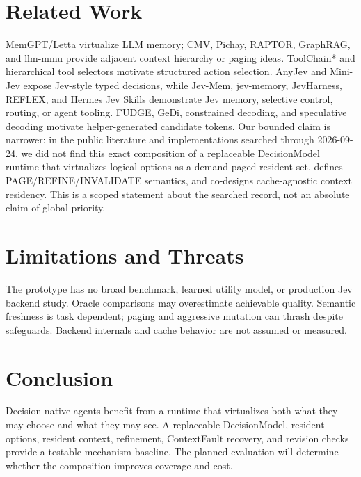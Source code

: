 \documentclass[11pt]{article}
\begin{document}
\section{Related Work}MemGPT/Letta virtualize LLM memory; CMV, Pichay, RAPTOR, GraphRAG, and llm-mmu provide adjacent context hierarchy or paging ideas. ToolChain* and hierarchical tool selectors motivate structured action selection. AnyJev and Mini-Jev expose Jev-style typed decisions, while Jev-Mem, jev-memory, JevHarness, REFLEX, and Hermes Jev Skills demonstrate Jev memory, selective control, routing, or agent tooling. FUDGE, GeDi, constrained decoding, and speculative decoding motivate helper-generated candidate tokens. Our bounded claim is narrower: in the public literature and implementations searched through 2026-09-24, we did not find this exact composition of a replaceable DecisionModel runtime that virtualizes logical options as a demand-paged resident set, defines PAGE/REFINE/INVALIDATE semantics, and co-designs cache-agnostic context residency. This is a scoped statement about the searched record, not an absolute claim of global priority.
\section{Limitations and Threats}The prototype has no broad benchmark, learned utility model, or production Jev backend study. Oracle comparisons may overestimate achievable quality. Semantic freshness is task dependent; paging and aggressive mutation can thrash despite safeguards. Backend internals and cache behavior are not assumed or measured.
\section{Conclusion}Decision-native agents benefit from a runtime that virtualizes both what they may choose and what they may see. A replaceable DecisionModel, resident options, resident context, refinement, ContextFault recovery, and revision checks provide a testable mechanism baseline. The planned evaluation will determine whether the composition improves coverage and cost.

\end{document}
